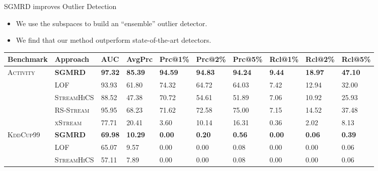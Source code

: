 \documentclass[16pt,usenames,dvipsnames, notheorems]{beamer}
\theoremstyle{definition}
\theoremstyle{example}
\theoremstyle{plain}
\begin{document}
\begin{frame}{SGMRD improves Outlier Detection}
\begin{itemize}
	\item We use the subspaces to build an ``ensemble'' outlier detector.
	\pause
	\item We find that our method outperform state-of-the-art detectors.
\end{itemize}

\begin{table}[]
	\renewrobustcmd{\boldmath}{}
	\centering
	\label{result:sgmrd_outlierdetection}
	\tiny
	
	\renewcommand{\arraystretch}{0.60}
	\begin{tabularx}{\textwidth}{@{}llXXXXXXXX@{}}
		\toprule
		Benchmark & Approach       & AUC            & AvgPrc             & Prc@1\%           & Prc@2\%           & Prc@5\%           & Rcl@1\%           & Rcl@2\%           & Rcl@5\%           \\ \midrule
		\textsc{Activity}  & \textsc{\textbf{{SGMRD}}} & \textbf{97.32} & \textbf{85.39} & \textbf{94.59} & \textbf{94.83} & \textbf{94.24} & \textbf{9.44}  & \textbf{18.97} & \textbf{47.10} \\
		& \textsc{LOF}      & 93.93          & 61.80          & 74.32          & 64.72          & 64.03          & 7.42           & 12.94          & 32.00          \\
		& \textsc{StreamHiCS}     & 88.52          & 47.38          & 70.72          & 54.61          & 51.89          & 7.06           & 10.92          & 25.93          \\
		& \textsc{RS-Stream}      & 95.95          & 68.23          & 71.62          & 72.58          & 75.00          & 7.15           & 14.52          & 37.48          \\
		& \textsc{xStream}        & 77.71          & 20.41          & 3.60           & 10.14          & 16.31          & 0.36           & 2.02           & 8.13           \\ \midrule
		\textsc{KddCup99}  & \textbf{{SGMRD}} & \textbf{69.98} & \textbf{10.29} & \textbf{0.00}  & \textbf{0.20}  & \textbf{0.56}  & \textbf{0.00}  & \textbf{0.06}  & \textbf{0.39}  \\
		& \textsc{LOF}      & 65.07          & 9.57           & 0.00           & 0.00           & 0.08           & 0.00           & 0.00           & 0.06           \\
		& \textsc{StreamHiCS}     & 57.11          & 7.89           & 0.00           & 0.00           & 0.08           & 0.00           & 0.00           & 0.06           \\

\end{tabularx}
\end{table}
\end{frame}
\end{document}
